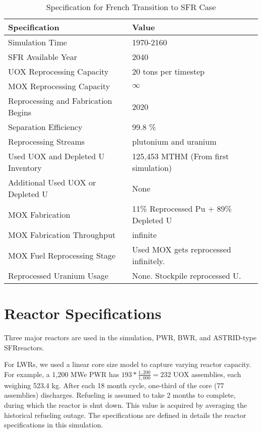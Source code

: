 \begin{table}[h]
	\centering
	\begin{tabularx}{\textwidth}{bb}
		\hline
		\textbf{Specification }& \textbf{Value} \\
		\hline
		Simulation Time & 1970-2160 \\
		\gls{SFR} Available Year & 2040 \\
		\gls{UOX} Reprocessing Capacity & 20 tons per timestep \\
		\gls{MOX} Reprocessing Capacity & $\infty$ \\
		Reprocessing and Fabrication Begins & 2020 \\
		Separation Efficiency & 99.8 \% \\
		Reprocessing Streams & plutonium and uranium \\
		\small{Used \gls{UOX} and Depleted U Inventory} & 125,453 MTHM {\small (From first simulation)} \\
		\small{Additional Used \gls{UOX} or Depleted U} & None  \\
		\gls{MOX} Fabrication &  \small{11\% Reprocessed Pu + 89\% Depleted U}  \\
		\gls{MOX} Fabrication Throughput & infinite \\
		\gls{MOX} Fuel Reprocessing Stage &  Used \gls{MOX} gets reprocessed infinitely. \\
		Reprocessed Uranium Usage &  None. Stockpile reprocessed U. \\
		\hline
	\end{tabularx}
	\caption {Specification for French Transition to \gls{SFR} Case}
	\label{tab:sim_france}
\end{table}


\section{Reactor Specifications}
Three major reactors are used in the simulation, \gls{PWR}, \gls{BWR}, and ASTRID-type \gls{SFR}reactors.

For \glspl{LWR}, we used a linear core size model to capture
varying reactor capacity. For example, a 
1,200 MWe PWR has $193*\frac{1,200}{1,000} = 232$ \gls{UOX} assemblies, each
weighing 523.4 kg.
After each 18 month cycle, one-third of the 
core (77 assemblies) discharges. Refueling
is assumed to take 2 months to complete, during which the reactor
is shut down. This value is acquired by averaging the 
historical refueling outage. The specifications are defined in 
 details the reactor specifications in this simulation.

